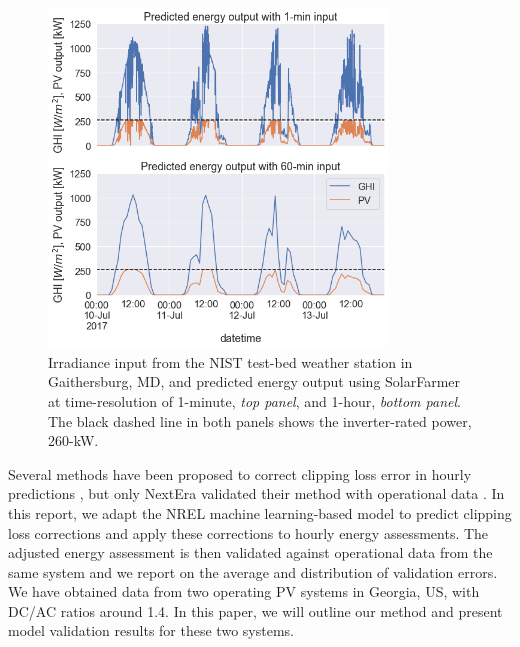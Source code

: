 \documentclass[conference]{IEEEtran}
\begin{document}
\begin{figure}[htbp]
\centerline{\includegraphics[width=9cm]{hourly_v_1-min_clipping.png}}
\caption{Irradiance input from the NIST test-bed weather station in Gaithersburg, MD, and predicted energy output using SolarFarmer at time-resolution of 1-minute, \textit{top panel}, and 1-hour, \textit{bottom panel}. The black dashed line in both panels shows the inverter-rated power, 260-kW.}
\label{fig:irradiance-and-power}
\end{figure}


Several methods have been proposed to correct clipping loss error in hourly predictions \cite{Cormode2019,Kharait,Anderson2020,Bradford}, but only NextEra validated their method with operational data \cite{Bradford}. 
In this report, we adapt the NREL machine learning-based model \cite{Anderson2020} to predict clipping loss corrections and apply these corrections to hourly energy assessments. The adjusted energy assessment is then validated against operational data from the same system and we report on the average and distribution of validation errors.  We have obtained data from two operating PV systems in Georgia, US, with DC/AC ratios around 1.4. In this paper, we will outline our method and present model validation results for these two systems. 
\end{document}
